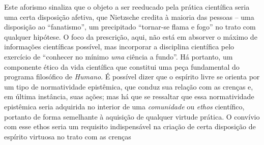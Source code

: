 \documentclass[
	12pt,				%
	openright,			%
	oneside,			%
	a4paper,			%
	english,			%
	french,				%
	spanish,			%
	brazil				%
	]{abntex2}
\begin{document}
Este aforismo sinaliza que o objeto a ser reeducado pela prática científica seria uma certa  disposição afetiva, que Nietzsche credita à maioria das pessoas – uma disposição ao “fanatismo”, um precipitado “tornar-se flama e fogo” no trato com qualquer hipótese. O foco da prescrição, aqui, não está em absorver o máximo de informações científicas possível, mas incorporar a disciplina científica pelo exercício de “conhecer no mínimo \textit{uma} ciência a fundo”. Há portanto, um componente ético da vida científica que constitui uma peça fundamental do programa filosófico de \textit{Humano}. É possível dizer que o espírito livre se orienta por um tipo de normatividade epistêmica, que conduz sua relação com as crenças e, em última instância, suas ações; mas há que se ressaltar que essa normatividade epistêmica seria adquirida no interior de uma \textit{comunidade} ou \textit{ethos} científico, portanto de forma semelhante à aquisição de qualquer virtude prática. O convívio com esse ethos seria um requisito indispensável na criação de certa disposição de espírito virtuosa no trato com as crenças
\end{document}
